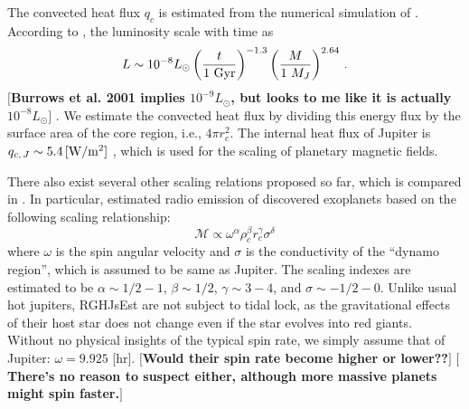 \documentclass{emulateapj}
\def\memoYF#1{\color{red}$[${\bf #1}$]$ \color{black}}
\def\memoDS#1{\color{blue}$[${\bf #1}$]$ \color{black}}
\begin{document}
The convected heat flux $q_c$ is estimated from the numerical simulation of \citep[e.g.][]{burrows_et_al2001,marley2007}. 
According to \citet{burrows_et_al2001}, the luminosity scale with time as
\begin{equation}
L \sim {10^{-8} L_\odot} \left( \frac{t}{1 \rm~Gyr} \right)^{-1.3} \left( \frac{M}{1~M_J} \right)^{2.64} \, .
\label{eq:burrowsLum}
\end{equation}
\memoYF{Burrows et al. 2001 implies $10^{-9} L_\odot $, but looks to me like it is actually $10^{-8} L_\odot $}. 
We estimate the convected heat flux by dividing this energy flux by the surface area of the core region, i.e., $4 \pi r_c^2$. 
The internal heat flux of Jupiter is  $q_{c,\,J} \sim 5.4\,{\rm [W/m^2]}$ \citep{hanel1981}, which is used for the scaling of planetary magnetic fields. 


There also exist several other scaling relations proposed so far, which is compared in \citet{christensen2010}. 
In particular, \citet{griebmeier2004} estimated radio emission of discovered exoplanets based on the following scaling relationship: 
\begin{equation}
\mathcal{M} \propto  \omega ^{\alpha } \rho_c ^{\beta } r_c^{\gamma } \sigma ^{\delta }
\end{equation}
where $\omega $ is the spin angular velocity and $\sigma $ is the conductivity of the ``dynamo region'', which is assumed to be same as Jupiter. 
The scaling indexes are estimated to be $\alpha \sim 1/2-1$, $\beta \sim 1/2$, $\gamma \sim 3-4$, and $\sigma \sim -1/2-0$. 
%
Unlike usual hot jupiters, RGHJsEst are not subject to tidal lock, as the gravitational effects of their host star does not change even if the star evolves into red giants. Without no physical insights of the typical spin rate, we simply assume that of Jupiter: $\omega = 9.925$ [hr]. 
\memoYF{Would their spin rate become higher or lower??}
\memoDS{There's no reason to suspect either, although more massive planets might spin faster.}

\end{document}
